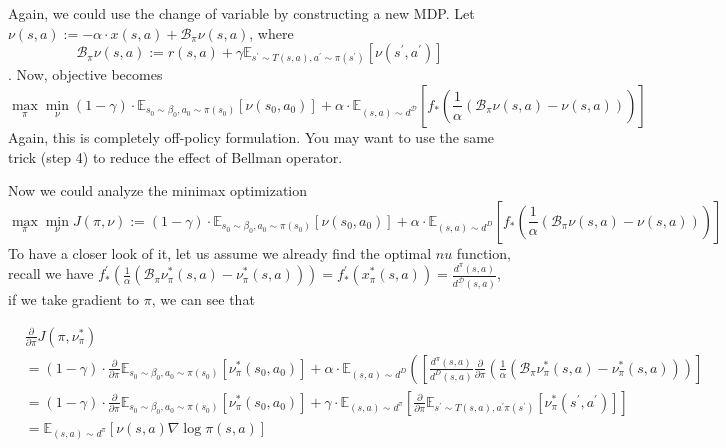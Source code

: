 \documentclass[a4paper]{article}
\theoremstyle{definition}
\begin{document}
Again, we could use the change of variable by constructing a new MDP.
Let $
\nu(s, a):=-\alpha \cdot x(s, a)+\mathcal{B}_{\pi} \nu(s, a)
$, where\begin{equation}
\mathcal{B}_{\pi} \nu(s, a):= r(s,a) + \gamma \mathbb{E}_{s^{\prime} \sim T(s, a), a^{\prime} \sim \pi\left(s^{\prime}\right)}\left[\nu\left(s^{\prime}, a^{\prime}\right)\right]
\end{equation}.
Now, objective becomes
\begin{equation}
\max _{\pi} \min _{\nu}(1-\gamma) \cdot \mathbb{E}_{s_{0} \sim \beta_{0}, a_{0} \sim \pi\left(s_{0}\right)}\left[\nu\left(s_{0}, a_{0}\right)\right]+\alpha \cdot \mathbb{E}_{(s, a) \sim d^{\mathcal{D}}}\left[f_{*}\left(\frac{1}{\alpha}\left(\mathcal{B}_{\pi} \nu(s, a)-\nu(s, a)\right)\right)\right]
\end{equation}
Again, this is completely off-policy formulation. You may want to use the same trick (step 4) to reduce the effect of Bellman operator.

Now we could analyze the minimax optimization
$$
\max _{\pi} \min _{\nu} J(\pi, \nu):=(1-\gamma) \cdot \mathbb{E}_{s_{0} \sim \beta_{0}, a_{0} \sim \pi\left(s_{0}\right)}\left[\nu\left(s_{0}, a_{0}\right)\right]+\alpha \cdot \mathbb{E}_{(s, a) \sim d^{D}}\left[f_{*}\left(\frac{1}{\alpha}\left(\mathcal{B}_{\pi} \nu(s, a)-\nu(s, a)\right)\right)\right]
$$
To have a closer look of it, let us assume we already find the optimal $nu$ function, recall we have $
f_{*}^{\prime}\left(\frac{1}{\alpha}\left(\mathcal{B}_{\pi} \nu_{\pi}^{*}(s, a)-\nu_{\pi}^{*}(s, a)\right)\right)=f_{*}^{\prime}\left(x_{\pi}^{*}(s, a)\right)=\frac{d^{\pi}(s, a)}{d^{\mathcal{D}}(s, a)}
$, if we take gradient to $\pi$, we can see that

$$
\begin{aligned} &\frac{\partial}{\partial \pi} J\left(\pi, \nu_{\pi}^{*}\right) \\
&=(1-\gamma) \cdot \frac{\partial}{\partial \pi} \mathbb{E}_{s_{0} \sim \beta_{0}, a_{0} \sim \pi\left(s_{0}\right)}\left[\nu_{\pi}^{*}\left(s_{0}, a_{0}\right)\right]+\alpha \cdot \mathbb{E}_{(s, a) \sim d^{D}}\left(\left[\frac{d^{\pi}(s, a)}{d^{D}(s, a)} \frac{\partial}{\partial \pi}\left(\frac{1}{\alpha}\left(\mathcal{B}_{\pi} \nu_{\pi}^{*}(s, a)-\nu_{\pi}^{*}(s, a)\right)\right)\right]\right.\\ &=(1-\gamma) \cdot \frac{\partial}{\partial \pi} \mathbb{E}_{s_{0} \sim \beta_{0}, a_{0} \sim \pi\left(s_{0}\right)}\left[\nu_{\pi}^{*}\left(s_{0}, a_{0}\right)\right]+\gamma \cdot \mathbb{E}_{(s, a) \sim d^{\pi}}\left[\frac{\partial}{\partial \pi} \mathbb{E}_{s^{\prime} \sim T(s, a), a^{\prime} \pi\left(s^{\prime}\right)}\left[\nu_{\pi}^{*}\left(s^{\prime}, a^{\prime}\right)\right]\right] \\ &=\mathbb{E}_{(s, a) \sim d^{\pi}}[\nu(s, a) \nabla \log \pi(s, a)] \end{aligned}
$$
\end{document}
